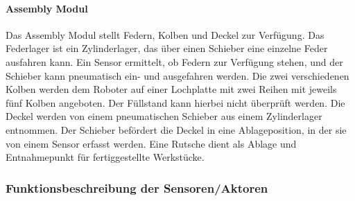 \documentclass[11pt,a4paper,ngerman]{article}
\begin{document}
\paragraph{Assembly Modul}
Das Assembly Modul stellt Federn, Kolben und Deckel zur Verfügung. Das Federlager ist ein Zylinderlager, das über einen Schieber eine einzelne Feder ausfahren kann. Ein Sensor ermittelt, ob Federn zur Verfügung stehen, und der Schieber kann pneumatisch ein- und ausgefahren werden. Die zwei verschiedenen Kolben werden dem Roboter auf einer Lochplatte mit zwei Reihen mit jeweils fünf Kolben angeboten. Der Füllstand kann hierbei nicht überprüft werden. Die Deckel werden von einem pneumatischen Schieber aus einem Zylinderlager entnommen. Der Schieber befördert die Deckel in eine Ablageposition, in der sie von einem Sensor erfasst werden. Eine Rutsche dient als Ablage und Entnahmepunkt für fertiggestellte Werkstücke.

\subsubsection{Funktionsbeschreibung der Sensoren/Aktoren}
\end{document}
